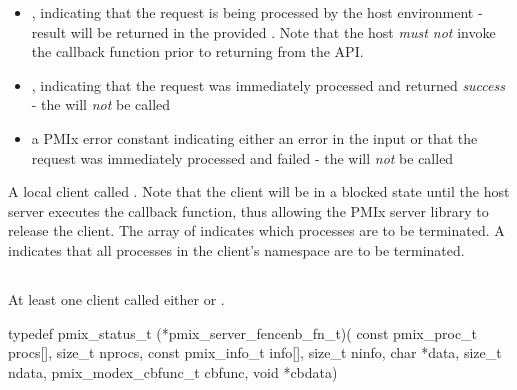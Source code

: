 \begin{itemize}
    \item {}, indicating that the request is being processed by the host environment - result will be returned in the provided . Note that the host \emph{must not} invoke the callback function prior to returning from the \ac{API}.
    \item {}, indicating that the request was immediately processed and returned \textit{success} - the  will \textit{not} be called
    \item a PMIx error constant indicating either an error in the input or that the request was immediately processed and failed - the  will \textit{not} be called
\end{itemize}

\descr

A local client called .
Note that the client will be in a blocked state until the host server executes the callback function, thus allowing the \ac{PMIx} server library to release the client.
The array of  indicates which processes are to be terminated.
A  indicates that all processes in the client's namespace are to be terminated.


\subsection{}

\summary

At least one client called either  or .

\format

\cspecificstart
\begin{codepar}
typedef pmix_status_t (*pmix_server_fencenb_fn_t)(
                             const pmix_proc_t procs[],
                             size_t nprocs,
                             const pmix_info_t info[],
                             size_t ninfo,
                             char *data, size_t ndata,
                             pmix_modex_cbfunc_t cbfunc,
                             void *cbdata)
\end{codepar}
\cspecificend

\begin{arglist}
\end{arglist}

